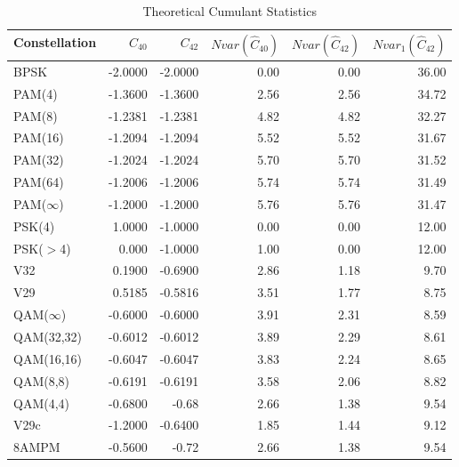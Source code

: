 \begin{table*}
\centering
\caption{Theoretical Cumulant Statistics \cite{swami2000}}
\begin{tabular}{ l | r | r| r| r| r } \hline
Constellation	& $C_{40}$ & $C_{42}$ & $N var(\hat{C}_{40})$ & $N var(\hat{C}_{42}) $ & $N var_1 (\hat{C}_{42})$ \\ \hline \hline
BPSK & -2.0000 & -2.0000 & 0.00 & 0.00 & 36.00 \\ \hline \hline
PAM(4) & -1.3600 & -1.3600 & 2.56 & 2.56 & 34.72 \\ 
PAM(8) & -1.2381 & -1.2381 & 4.82 & 4.82 & 32.27 \\
PAM(16) & -1.2094 & -1.2094 & 5.52 & 5.52 & 31.67 \\
PAM(32) & -1.2024 & -1.2024 & 5.70 & 5.70 & 31.52 \\ 
PAM(64) & -1.2006 & -1.2006 & 5.74 & 5.74 & 31.49 \\
PAM($\infty$) & -1.2000 & -1.2000 & 5.76 & 5.76 & 31.47 \\ \hline \hline
PSK(4) & 1.0000 & -1.0000 & 0.00 & 0.00 & 12.00 \\ \hline
PSK($>$4) & 0.000 & -1.0000 & 1.00 & 0.00 & 12.00 \\ \hline \hline
V32 & 0.1900 & -0.6900 & 2.86 & 1.18 & 9.70 \\ \hline
V29 & 0.5185 & -0.5816 & 3.51 & 1.77 & 8.75 \\
QAM($\infty$) & -0.6000 & -0.6000 & 3.91 & 2.31 & 8.59 \\
QAM(32,32) & -0.6012 & -0.6012 & 3.89 & 2.29 & 8.61 \\
QAM(16,16) & -0.6047 & -0.6047 & 3.83 & 2.24 & 8.65 \\ 
QAM(8,8) & -0.6191 & -0.6191 & 3.58 & 2.06 & 8.82 \\
QAM(4,4) & -0.6800 & -0.68 & 2.66 & 1.38 & 9.54 \\ \hline
V29c & -1.2000 & -0.6400 & 1.85 & 1.44 & 9.12 \\ \hline
8AMPM & -0.5600 & -0.72 & 2.66 & 1.38 & 9.54 \\ \hline 
\end{tabular}
\label{tab:ModelAndFreq}
\label{tab:cumulantStat}
\end{table*}


